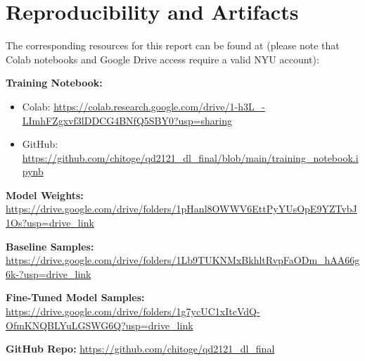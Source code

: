 \documentclass[11pt]{article}
\begin{document}
\section{Reproducibility and Artifacts} \label{repro}

The corresponding resources for this report can be found at (please note that Colab notebooks and Google Drive access require a valid NYU account):   

\textbf{Training Notebook:} 

\begin{itemize}
    \item Colab: \url{https://colab.research.google.com/drive/1-h3L_-LImhFZgxvf3lDDCG4BNfQ5SBY0?usp=sharing}
    \item GitHub: \url{https://github.com/chitoge/qd2121_dl_final/blob/main/training_notebook.ipynb}
\end{itemize}

\textbf{Model Weights:} \url{https://drive.google.com/drive/folders/1pHanl8OWWV6EttPyYUsOpE9YZTvbJ1Os?usp=drive_link}

\textbf{Baseline Samples:} \url{https://drive.google.com/drive/folders/1Lb9TUKNMxBkhltRvpFaODm_hAA66g6k-?usp=drive_link}

\textbf{Fine-Tuned Model Samples:} \url{https://drive.google.com/drive/folders/1g7ycUC1xItcVdQ-OfmKNQBLYuLGSWG6Q?usp=drive_link}

\textbf{GitHub Repo:} \url{https://github.com/chitoge/qd2121_dl_final}

%

\end{document}
